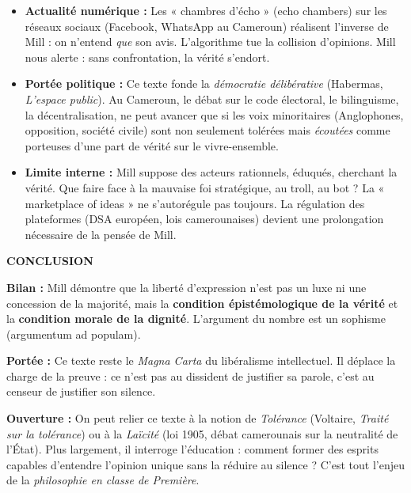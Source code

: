 \documentclass[11pt]{article}
\begin{document}
\begin{exoresolu}
\begin{itemize}
    \item \textbf{Actualité numérique :} Les « chambres d'écho » (echo chambers) sur les réseaux sociaux (Facebook, WhatsApp au Cameroun) réalisent l'inverse de Mill : on n'entend \emph{que} son avis. L'algorithme tue la collision d'opinions. Mill nous alerte : sans confrontation, la vérité s'endort.
    \item \textbf{Portée politique :} Ce texte fonde la \emph{démocratie délibérative} (Habermas, \emph{L'espace public}). Au Cameroun, le débat sur le code électoral, le bilinguisme, la décentralisation, ne peut avancer que si les voix minoritaires (Anglophones, opposition, société civile) sont non seulement tolérées mais \emph{écoutées} comme porteuses d'une part de vérité sur le vivre-ensemble.
    \item \textbf{Limite interne :} Mill suppose des acteurs rationnels, éduqués, cherchant la vérité. Que faire face à la mauvaise foi stratégique, au troll, au bot ? La « marketplace of ideas » ne s'autorégule pas toujours. La régulation des plateformes (DSA européen, lois camerounaises) devient une prolongation nécessaire de la pensée de Mill.
\end{itemize}

\textbf{CONCLUSION}

\textbf{Bilan :} Mill démontre que la liberté d'expression n'est pas un luxe ni une concession de la majorité, mais la \textbf{condition épistémologique de la vérité} et la \textbf{condition morale de la dignité}. L'argument du nombre est un sophisme (argumentum ad populam).

\textbf{Portée :} Ce texte reste le \emph{Magna Carta} du libéralisme intellectuel. Il déplace la charge de la preuve : ce n'est pas au dissident de justifier sa parole, c'est au censeur de justifier son silence.

\textbf{Ouverture :} On peut relier ce texte à la notion de \emph{Tolérance} (Voltaire, \emph{Traité sur la tolérance}) ou à la \emph{Laïcité} (loi 1905, débat camerounais sur la neutralité de l'État). Plus largement, il interroge l'éducation : comment former des esprits capables d'entendre l'opinion unique sans la réduire au silence ? C'est tout l'enjeu de la \emph{philosophie en classe de Première}.
\end{exoresolu}
\end{document}
